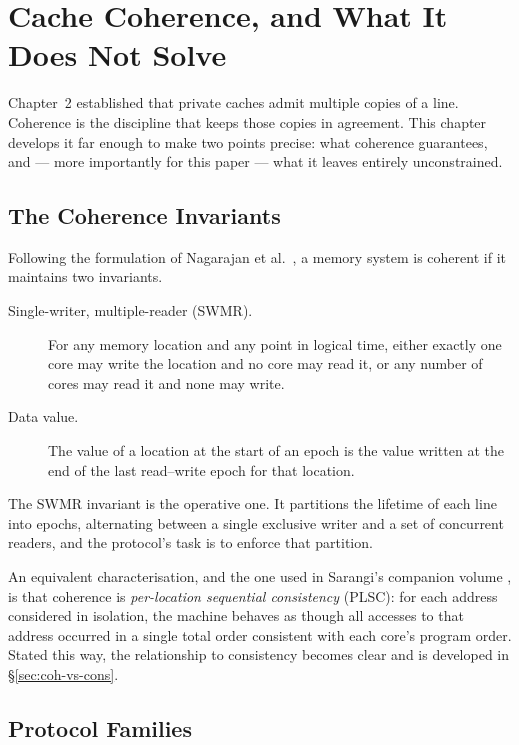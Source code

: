 \chapter{Cache Coherence, and What It Does Not Solve}
\label{ch:coherence}

Chapter~2 established that private caches admit multiple copies of a line.
Coherence is the discipline that keeps those copies in agreement.
This chapter
develops it far enough to make two points precise: what coherence guarantees, and
--- more importantly for this paper --- what it leaves entirely unconstrained.

\section{The Coherence Invariants}
\label{sec:invariants}

Following the formulation of Nagarajan et al.\ \cite{nagarajan2020primer}, a
memory system is coherent if it maintains two invariants.

\begin{description}
\item[Single-writer, multiple-reader (SWMR).] For any memory location and any
  point in logical time, either exactly one core may write the location and no
  core may read it, or any number of cores may read it and none may write.
\item[Data value.] The value of a location at the start of an epoch is the value
  written at the end of the last read--write epoch for that location.
\end{description}

The SWMR invariant is the operative one.
It partitions the lifetime of each line
into epochs, alternating between a single exclusive writer and a set of concurrent
readers, and the protocol's task is to enforce that partition.

An equivalent characterisation, and the one used in Sarangi's companion volume
\cite{sarangi2023nextgen}, is that coherence is \emph{per-location sequential
consistency} (PLSC): for each address considered in isolation, the machine behaves
as though all accesses to that address occurred in a single total order consistent
with each core's program order.
Stated this way, the relationship to consistency
becomes clear and is developed in \S\ref{sec:coh-vs-cons}.

\section{Protocol Families}
\label{sec:protocols}

